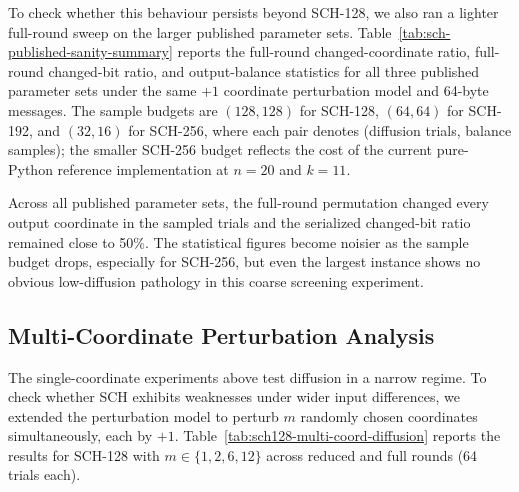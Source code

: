 ﻿\documentclass[english]{aucmcs}
\begin{document}
To check whether this behaviour persists beyond SCH-128, we also ran a lighter
full-round sweep on the larger published parameter sets. Table~\ref{tab:sch-published-sanity-summary}
reports the full-round changed-coordinate ratio, full-round changed-bit ratio,
and output-balance statistics for all three published parameter sets under the
same $+1$ coordinate perturbation model and 64-byte messages. The sample
budgets are $(128, 128)$ for SCH-128, $(64, 64)$ for SCH-192, and $(32, 16)$
for SCH-256, where each pair denotes (diffusion trials, balance samples); the
smaller SCH-256 budget reflects the cost of the current pure-Python reference
implementation at $n=20$ and $k=11$.

\begin{table}[H]
\centering
\caption{Full-round differential/statistical sanity summary for the published SCH parameter sets.}
\label{tab:sch-published-sanity-summary}
%
\end{table}

Across all published parameter sets, the full-round permutation changed every
output coordinate in the sampled trials and the serialized changed-bit ratio
remained close to 50\%. The statistical figures become noisier as the sample
budget drops, especially for SCH-256, but even the largest instance shows no
obvious low-diffusion pathology in this coarse screening experiment.

\subsection{Multi-Coordinate Perturbation Analysis}

The single-coordinate experiments above test diffusion in a narrow regime.
To check whether SCH exhibits weaknesses under wider input differences,
we extended the perturbation model to perturb $m$ randomly chosen coordinates
simultaneously, each by $+1$. Table~\ref{tab:sch128-multi-coord-diffusion}
reports the results for SCH-128 with $m \in \{1, 2, 6, 12\}$ across reduced
and full rounds (64 trials each).
\end{document}
